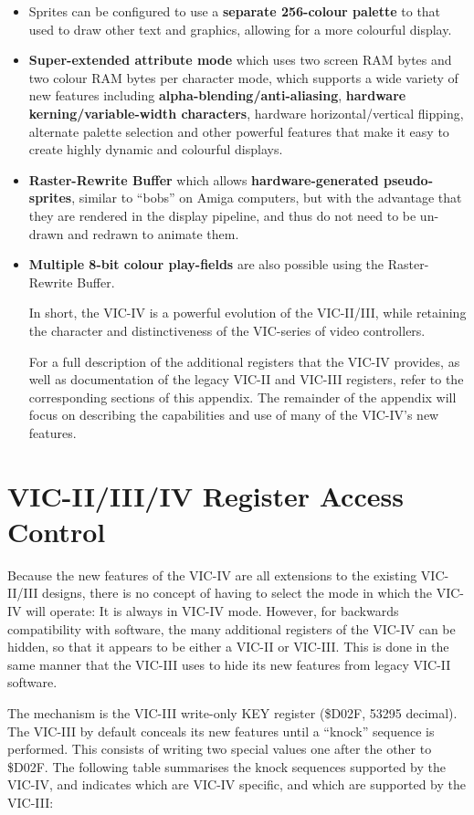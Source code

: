 \begin{itemize}
  \item Sprites can be configured to use a {\bf separate 256-colour palette} to that used to draw other text and graphics, allowing for a more colourful display.
  \item {\bf Super-extended attribute mode} which uses two screen RAM bytes and two colour RAM bytes per character mode, which supports a wide variety of new features including {\bf alpha-blending/anti-aliasing}, {\bf hardware kerning/variable-width characters}, hardware horizontal/vertical flipping, alternate palette selection and other powerful features that make it easy to create highly dynamic and colourful displays.
  \item {\bf Raster-Rewrite Buffer} which allows {\bf hardware-generated pseudo-sprites}, similar to ``bobs'' on Amiga\texttrademark{} computers, but with the advantage that they are rendered in the display pipeline, and thus do not need to be un-drawn and redrawn to animate them.
    \item {\bf Multiple 8-bit colour play-fields} are also possible using the Raster-Rewrite Buffer.

      In short, the VIC-IV is a powerful evolution of the VIC-II/III, while retaining the character and distinctiveness of the VIC-series of
      video controllers.

      For a full description of the additional registers that the VIC-IV provides, as well as documentation of the legacy VIC-II and VIC-III registers, refer to the corresponding sections of this appendix. The remainder of the appendix will focus on describing the capabilities and use of many of the VIC-IV's new features.
\end{itemize}

\section{VIC-II/III/IV Register Access Control}
Because the new features of the VIC-IV are all extensions to the existing VIC-II/III designs, there is no concept of having to select the mode in which the VIC-IV will operate: It is always in VIC-IV mode. However, for backwards compatibility with software, the many additional registers of the VIC-IV can be hidden, so that it appears to be either a VIC-II or VIC-III. This is done in the same manner that the VIC-III uses to hide its new features from legacy VIC-II software.

 The mechanism is the VIC-III write-only KEY register (\$D02F, 53295 decimal).  The VIC-III by default conceals its new features until a ``knock'' sequence is performed.  This consists of writing two special values one after the other to \$D02F.  The following table summarises the knock sequences supported by the VIC-IV, and indicates which are VIC-IV specific, and which are supported by the VIC-III:

